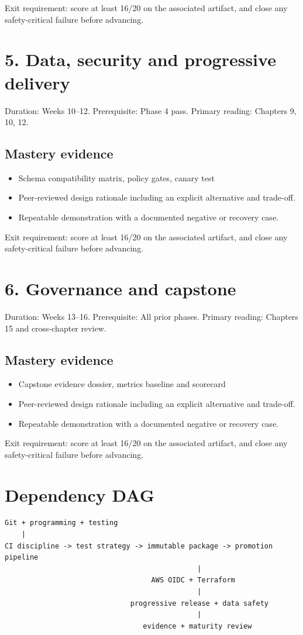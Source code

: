 \documentclass[10pt,letterpaper]{article}
\begin{document}
Exit requirement: score at least 16/20 on the associated artifact, and close any safety-critical failure before advancing.


\section{5. Data, security and progressive delivery}
Duration: Weeks 10--12. Prerequisite: Phase 4 pass. Primary reading: Chapters 9, 10, 12.

\subsection{Mastery evidence}
\begin{itemize}
\item Schema compatibility matrix, policy gates, canary test
\item Peer-reviewed design rationale including an explicit alternative and trade-off.
\item Repeatable demonstration with a documented negative or recovery case.
\end{itemize}

Exit requirement: score at least 16/20 on the associated artifact, and close any safety-critical failure before advancing.


\section{6. Governance and capstone}
Duration: Weeks 13--16. Prerequisite: All prior phases. Primary reading: Chapters 15 and cross-chapter review.

\subsection{Mastery evidence}
\begin{itemize}
\item Capstone evidence dossier, metrics baseline and scorecard
\item Peer-reviewed design rationale including an explicit alternative and trade-off.
\item Repeatable demonstration with a documented negative or recovery case.
\end{itemize}

Exit requirement: score at least 16/20 on the associated artifact, and close any safety-critical failure before advancing.


\section{Dependency DAG}
\begin{verbatim}
Git + programming + testing
    |
CI discipline -> test strategy -> immutable package -> promotion pipeline
                                              |
                                   AWS OIDC + Terraform
                                              |
                              progressive release + data safety
                                              |
                                 evidence + maturity review
\end{verbatim}
\end{document}
